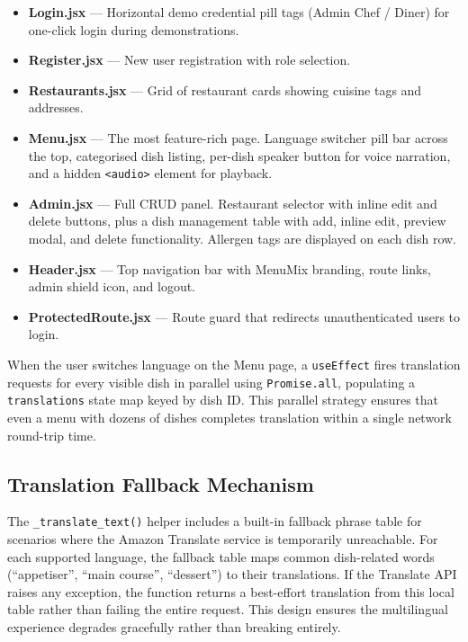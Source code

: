 \documentclass[conference]{IEEEtran}
\begin{document}
\begin{itemize}[leftmargin=*]
    \item \textbf{Login.jsx} --- Horizontal demo credential pill tags (Admin Chef / Diner) for one-click login during demonstrations.
    \item \textbf{Register.jsx} --- New user registration with role selection.
    \item \textbf{Restaurants.jsx} --- Grid of restaurant cards showing cuisine tags and addresses.
    \item \textbf{Menu.jsx} --- The most feature-rich page. Language switcher pill bar across the top, categorised dish listing, per-dish speaker button for voice narration, and a hidden \texttt{<audio>} element for playback.
    \item \textbf{Admin.jsx} --- Full CRUD panel. Restaurant selector with inline edit and delete buttons, plus a dish management table with add, inline edit, preview modal, and delete functionality. Allergen tags are displayed on each dish row.
    \item \textbf{Header.jsx} --- Top navigation bar with MenuMix branding, route links, admin shield icon, and logout.
    \item \textbf{ProtectedRoute.jsx} --- Route guard that redirects unauthenticated users to login.
\end{itemize}

When the user switches language on the Menu page, a \texttt{useEffect} fires translation requests for every visible dish in parallel using \texttt{Promise.all}, populating a \texttt{translations} state map keyed by dish ID. This parallel strategy ensures that even a menu with dozens of dishes completes translation within a single network round-trip time.

\subsection{Translation Fallback Mechanism}

The \texttt{\_translate\_text()} helper includes a built-in fallback phrase table for scenarios where the Amazon Translate service is temporarily unreachable. For each supported language, the fallback table maps common dish-related words (``appetiser'', ``main course'', ``dessert'') to their translations. If the Translate API raises any exception, the function returns a best-effort translation from this local table rather than failing the entire request. This design ensures the multilingual experience degrades gracefully rather than breaking entirely.
\end{document}

